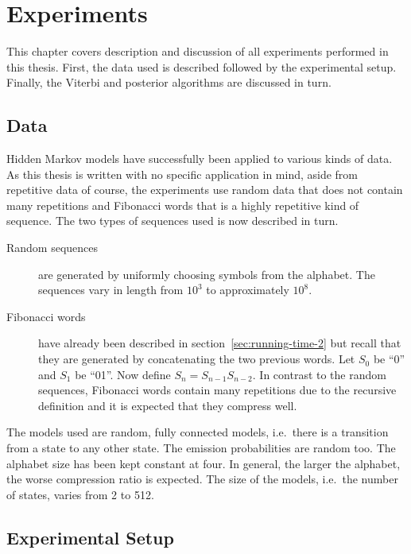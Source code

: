 \chapter{Experiments}
\label{cha:experiments}

This chapter covers description and discussion of all experiments performed in
this thesis. First, the data used is described followed by the experimental
setup. Finally, the Viterbi and posterior algorithms are discussed in turn.

\section{Data}

Hidden Markov models have successfully been applied to various kinds of
data.  As this thesis is written with no specific application in mind, aside
from repetitive data of course, the experiments use random data that does not
contain many repetitions and Fibonacci words that is a highly repetitive kind
of sequence.  The two types of sequences used is now described in turn.

\begin{description}
\item[Random sequences] are generated by uniformly choosing symbols from the
  alphabet. The sequences vary in length from $10^3$ to approximately $10^8$.
\item[Fibonacci words] have already been described in
  section~\ref{sec:running-time-2} but recall that they are generated by
  concatenating the two previous words. Let $S_0$ be ``0'' and $S_1$ be
  ``01''. Now define $S_n=S_{n-1}S_{n-2}$. In contrast to the random sequences,
  Fibonacci words contain many repetitions due to the recursive definition and
  it is expected that they compress well.
\end{description}

The models used are random, fully connected models, i.e.\ there is a
transition from a state to any other state. The emission probabilities are
random too. The alphabet size has been kept constant at four. In general, the
larger the alphabet, the worse compression ratio is expected. The size of the
models, i.e.\ the number of states, varies from 2 to 512.

\section{Experimental Setup}

